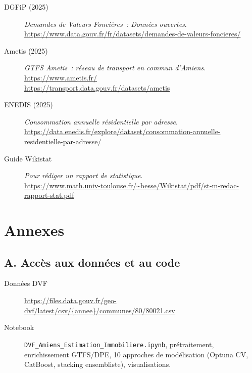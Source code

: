 \documentclass[12pt,a4paper]{article}
\begin{document}
\begin{description}
    \item[DGFiP (2025)] \textit{Demandes de Valeurs Fonci\`eres~: Donn\'ees ouvertes}.\\
    \url{https://www.data.gouv.fr/fr/datasets/demandes-de-valeurs-foncieres/}
    \item[Ametis (2025)] \textit{GTFS Ametis~: r\'eseau de transport en commun d'Amiens}.\\
    \url{https://www.ametis.fr/} \\ \url{https://transport.data.gouv.fr/datasets/ametis}
   
    \item[ENEDIS (2025)] \textit{Consommation annuelle r\'esidentielle par adresse}.\\
    \url{https://data.enedis.fr/explore/dataset/consommation-annuelle-residentielle-par-adresse/}
    \item[Guide Wikistat] \textit{Pour r\'ediger un rapport de statistique}.\\
    \url{https://www.math.univ-toulouse.fr/~besse/Wikistat/pdf/st-m-redac-rapport-stat.pdf}
\end{description}

\newpage
\appendix
\section*{Annexes}

\subsection*{A. Acc\`es aux donn\'ees et au code}

\begin{description}
    \item[Donn\'ees DVF] \url{https://files.data.gouv.fr/geo-dvf/latest/csv/{annee}/communes/80/80021.csv}
    \item[Notebook] \texttt{DVF\_Amiens\_Estimation\_Immobiliere.ipynb}, pr\'etraitement, enrichissement GTFS/DPE, 10 approches de mod\'elisation (Optuna CV, CatBoost, stacking ensembliste), visualisations.
    
\end{description}
\end{document}
